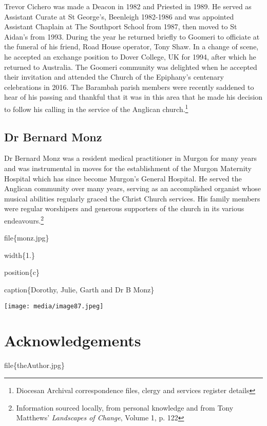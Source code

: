 Trevor Cichero was made a Deacon in 1982 and Priested in 1989. He served as Assistant Curate at St George's, Beenleigh 1982-1986 and was appointed Assistant Chaplain at The Southport School from 1987, then moved to St Aidan's from 1993. During the year he returned briefly to Goomeri to officiate at the funeral of his friend, Road House operator, Tony Shaw. In a change of scene, he accepted an exchange position to Dover College, UK for 1994, after which he returned to Australia. The Goomeri community was delighted when he accepted their invitation and attended the Church of the Epiphany's centenary celebrations in 2016. The Barambah parish members were recently saddened to hear of his passing and thankful that it was in this area that he made his decision to follow his calling in the service of the Anglican church.\footnote{Diocesan Archival correspondence files, clergy and services register details}

\hypertarget{dr-bernard-monz}{%
\section{Dr Bernard Monz}\label{dr-bernard-monz}}

Dr Bernard Monz was a resident medical practitioner in Murgon for many years and was instrumental in moves for the establishment of the Murgon Maternity Hospital which has since become Murgon's General Hospital. He served the Anglican community over many years, serving as an accomplished organist whose musical abilities regularly graced the Christ Church services. His family members were regular worshipers and generous supporters of the church in its various endeavours.\footnote{Information sourced locally, from personal knowledge and from Tony Matthews' \emph{Landscapes of Change}, Volume 1, p. 122}

file\{monz.jpg\}

width\{1.\}

position\{c\}

caption\{Dorothy, Julie, Garth and Dr B Monz\}

\texttt{[image: media/image87.jpeg]}

\hypertarget{acknowledgements}{%
\chapter{Acknowledgements}\label{acknowledgements}}

file\{theAuthor.jpg\}

